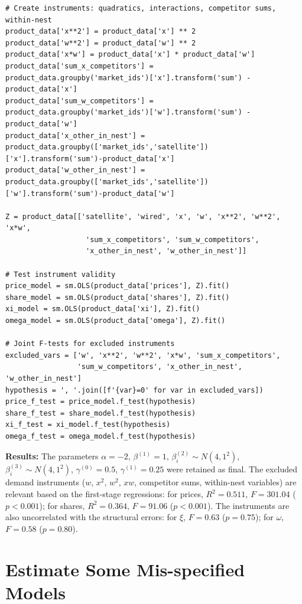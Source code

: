 \documentclass[english,11pt]{article}
\begin{document}
\begin{verbatim}
# Create instruments: quadratics, interactions, competitor sums, within-nest
product_data['x**2'] = product_data['x'] ** 2
product_data['w**2'] = product_data['w'] ** 2
product_data['x*w'] = product_data['x'] * product_data['w']
product_data['sum_x_competitors'] = 
product_data.groupby('market_ids')['x'].transform('sum') - product_data['x']
product_data['sum_w_competitors'] = 
product_data.groupby('market_ids')['w'].transform('sum') - product_data['w']
product_data['x_other_in_nest'] = 
product_data.groupby(['market_ids','satellite'])['x'].transform('sum')-product_data['x']
product_data['w_other_in_nest'] = 
product_data.groupby(['market_ids','satellite'])['w'].transform('sum')-product_data['w']

Z = product_data[['satellite', 'wired', 'x', 'w', 'x**2', 'w**2', 'x*w', 
                   'sum_x_competitors', 'sum_w_competitors', 
                   'x_other_in_nest', 'w_other_in_nest']]

# Test instrument validity
price_model = sm.OLS(product_data['prices'], Z).fit()
share_model = sm.OLS(product_data['shares'], Z).fit()
xi_model = sm.OLS(product_data['xi'], Z).fit()
omega_model = sm.OLS(product_data['omega'], Z).fit()

# Joint F-tests for excluded instruments
excluded_vars = ['w', 'x**2', 'w**2', 'x*w', 'sum_x_competitors', 
                 'sum_w_competitors', 'x_other_in_nest', 'w_other_in_nest']
hypothesis = ', '.join([f'{var}=0' for var in excluded_vars])
price_f_test = price_model.f_test(hypothesis)
share_f_test = share_model.f_test(hypothesis)
xi_f_test = xi_model.f_test(hypothesis)
omega_f_test = omega_model.f_test(hypothesis)
\end{verbatim}


\textbf{Results:} The parameters $\alpha = -2$, $\beta^{(1)} = 1$, $\beta_i^{(2)} \sim N(4, 1^2)$, $\beta_i^{(3)} \sim N(4, 1^2)$, $\gamma^{(0)} = 0.5$, $\gamma^{(1)} = 0.25$ were retained as final. 
The excluded demand instruments 
($w$, $x^2$, $w^2$, $xw$, competitor sums, within-nest variables) 
are relevant based on the first-stage regressions: 
for prices, $R^2 = 0.511$, $F = 301.04$ ($p < 0.001$); 
for shares, $R^2 = 0.364$, $F = 91.06$ ($p < 0.001$). 
The instruments are also uncorrelated with the structural errors: 
for $\xi$, $F = 0.63$ ($p = 0.75$); 
for $\omega$, $F = 0.58$ ($p = 0.80$).

\section{Estimate Some Mis-specified Models}
\end{document}
